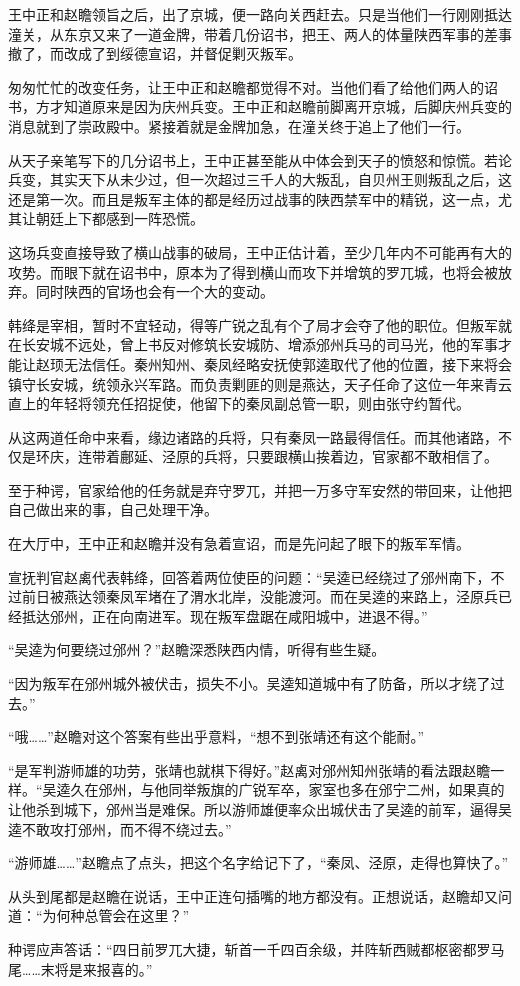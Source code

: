 王中正和赵瞻领旨之后，出了京城，便一路向关西赶去。只是当他们一行刚刚抵达潼关，从东京又来了一道金牌，带着几份诏书，把王、两人的体量陕西军事的差事撤了，而改成了到绥德宣诏，并督促剿灭叛军。

匆匆忙忙的改变任务，让王中正和赵瞻都觉得不对。当他们看了给他们两人的诏书，方才知道原来是因为庆州兵变。王中正和赵瞻前脚离开京城，后脚庆州兵变的消息就到了崇政殿中。紧接着就是金牌加急，在潼关终于追上了他们一行。

从天子亲笔写下的几分诏书上，王中正甚至能从中体会到天子的愤怒和惊慌。若论兵变，其实天下从未少过，但一次超过三千人的大叛乱，自贝州王则叛乱之后，这还是第一次。而且是叛军主体的都是经历过战事的陕西禁军中的精锐，这一点，尤其让朝廷上下都感到一阵恐慌。

这场兵变直接导致了横山战事的破局，王中正估计着，至少几年内不可能再有大的攻势。而眼下就在诏书中，原本为了得到横山而攻下并增筑的罗兀城，也将会被放弃。同时陕西的官场也会有一个大的变动。

韩绛是宰相，暂时不宜轻动，得等广锐之乱有个了局才会夺了他的职位。但叛军就在长安城不远处，曾上书反对修筑长安城防、增添邠州兵马的司马光，他的军事才能让赵顼无法信任。秦州知州、秦凤经略安抚使郭逵取代了他的位置，接下来将会镇守长安城，统领永兴军路。而负责剿匪的则是燕达，天子任命了这位一年来青云直上的年轻将领充任招捉使，他留下的秦凤副总管一职，则由张守约暂代。

从这两道任命中来看，缘边诸路的兵将，只有秦凤一路最得信任。而其他诸路，不仅是环庆，连带着鄜延、泾原的兵将，只要跟横山挨着边，官家都不敢相信了。

至于种谔，官家给他的任务就是弃守罗兀，并把一万多守军安然的带回来，让他把自己做出来的事，自己处理干净。

在大厅中，王中正和赵瞻并没有急着宣诏，而是先问起了眼下的叛军军情。

宣抚判官赵禼代表韩绛，回答着两位使臣的问题：“吴逵已经绕过了邠州南下，不过前日被燕达领秦凤军堵在了渭水北岸，没能渡河。而在吴逵的来路上，泾原兵已经抵达邠州，正在向南进军。现在叛军盘踞在咸阳城中，进退不得。”

“吴逵为何要绕过邠州？”赵瞻深悉陕西内情，听得有些生疑。

“因为叛军在邠州城外被伏击，损失不小。吴逵知道城中有了防备，所以才绕了过去。”

“哦……”赵瞻对这个答案有些出乎意料，“想不到张靖还有这个能耐。”

“是军判游师雄的功劳，张靖也就棋下得好。”赵禼对邠州知州张靖的看法跟赵瞻一样。“吴逵久在邠州，与他同举叛旗的广锐军卒，家室也多在邠宁二州，如果真的让他杀到城下，邠州当是难保。所以游师雄便率众出城伏击了吴逵的前军，逼得吴逵不敢攻打邠州，而不得不绕过去。”

“游师雄……”赵瞻点了点头，把这个名字给记下了，“秦凤、泾原，走得也算快了。”

从头到尾都是赵瞻在说话，王中正连句插嘴的地方都没有。正想说话，赵瞻却又问道：“为何种总管会在这里？”

种谔应声答话：“四日前罗兀大捷，斩首一千四百余级，并阵斩西贼都枢密都罗马尾……末将是来报喜的。”

